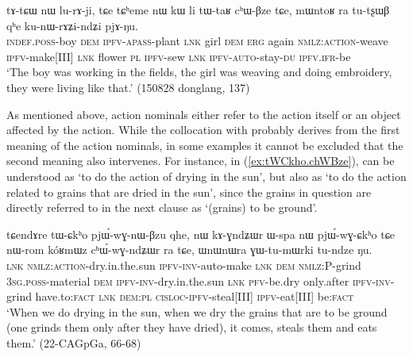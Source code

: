\begin{exe}
\ex \label{ex:tWtAR.chWBze}
\gll tɤ-tɕɯ nɯ lu-rɤ-ji,  tɕe tɕʰeme nɯ kɯ li tɯ-taʁ cʰɯ-βze tɕe, mɯntoʁ ra tu-tʂɯβ qʰe ku-nɯ-rɤʑi-ndʑi pjɤ-ŋu.  \\
\textsc{indef}.\textsc{poss}-boy \textsc{dem} \textsc{ipfv}-\textsc{apass}-plant \textsc{lnk} girl \textsc{dem} \textsc{erg} again \textsc{nmlz}:\textsc{action}-weave \textsc{ipfv}-make[III] \textsc{lnk} flower \textsc{pl} \textsc{ipfv}-sew \textsc{lnk} \textsc{ipfv}-\textsc{auto}-stay-\textsc{du} \textsc{ipfv}.\textsc{ifr}-be \\
\glt `The boy was working in the fields, the girl was weaving and doing embroidery, they were living like that.' (150828 donglang, 137)
\end{exe}

As mentioned above, action nominals either refer to the action itself or an object affected by the action. While the collocation with  probably derives from the first meaning of the action nominals, in some examples it cannot be excluded that the second meaning also intervenes. For instance, in (\ref{ex:tWCkho.chWBze}),  can be understood as `to do the action of drying in the sun', but also as `to do the action related to grains that are dried in the sun', since the grains in question are directly referred to in the next clause as  `(grains) to be ground'.

\begin{exe}
\ex \label{ex:tWCkho.chWBze}
\gll tɕendɤre tɯ-ɕkʰo pjɯ́-wɣ-nɯ-βzu qhe, nɯ kɤ-ɣndʑɯr ɯ-spa nɯ pjɯ́-wɣ-ɕkʰo tɕe nɯ-rom kóʁmɯz cʰɯ́-wɣ-ndʑɯr ra tɕe, ɯnɯnɯra ɣɯ-tu-mɯrki tu-ndze ŋu. \\
\textsc{lnk} \textsc{nmlz}:\textsc{action}-dry.in.the.sun \textsc{ipfv}-\textsc{inv}-auto-make \textsc{lnk} \textsc{dem} \textsc{nmlz}:P-grind \textsc{3sg}.\textsc{poss}-material \textsc{dem} \textsc{ipfv}-\textsc{inv}-dry.in.the.sun \textsc{lnk} \textsc{pfv}-be.dry only.after \textsc{ipfv}-\textsc{inv}-grind have.to:\textsc{fact} \textsc{lnk} \textsc{dem}:\textsc{pl} \textsc{cisloc}-\textsc{ipfv}-steal[III] \textsc{ipfv}-eat[III] be:\textsc{fact} \\
\glt `When we do drying in the sun, when we dry the grains that are to be ground (one grinds them only after they have dried), it comes, steals them and eats them.' (22-CAGpGa, 66-68)
\end{exe}

